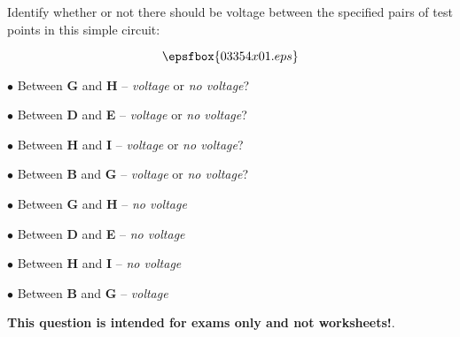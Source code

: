 

Identify whether or not there should be voltage between the specified pairs of test points in this simple circuit:

$$\epsfbox{03354x01.eps}$$

\medskip
\item{$\bullet$} Between {\bf G} and {\bf H} -- {\it voltage} or {\it no voltage}?
\item{$\bullet$} Between {\bf D} and {\bf E} -- {\it voltage} or {\it no voltage}?
\item{$\bullet$} Between {\bf H} and {\bf I} -- {\it voltage} or {\it no voltage}?
\item{$\bullet$} Between {\bf B} and {\bf G} -- {\it voltage} or {\it no voltage}?
\medskip







\medskip
\item{$\bullet$} Between {\bf G} and {\bf H} -- {\it no voltage}
\item{$\bullet$} Between {\bf D} and {\bf E} -- {\it no voltage}
\item{$\bullet$} Between {\bf H} and {\bf I} -- {\it no voltage}
\item{$\bullet$} Between {\bf B} and {\bf G} -- {\it voltage}
\medskip







{\bf This question is intended for exams only and not worksheets!}.



